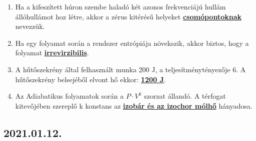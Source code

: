\documentclass[../../fizika_kerdesek.tex]{subfiles}
\begin{document}
{\begin{enumerate}
                \item Ha a kifeszített húron szembe haladó két azonos frekvenciájú hullám állóhullámot hoz létre, akkor a zérus kitérésű helyeket \underline{\textbf{csomópontoknak}} nevezzük.
                \item Ha egy folyamat során a rendszer entrópiája növekszik, akkor biztos, hogy a folyamat \underline{\textbf{irrevirzibilis}}.
                \item A hűtőszekrény által felhasznált munka 200 J, a teljesítménytényezője 6. A hűtőszekrény belsejéből elvont hő ekkor: \underline{\textbf{1200 J}}.
                \item Az Adiabatikus folyamatok során a $P \cdot V^k$ szorzat állandó. A térfogat kitevőjében szereplő k konstans az \underline{\textbf{izobár és az izochor mólhő}} hányadosa.
            \end{enumerate}}

    \subsection{2021.01.12.}
\end{document}
